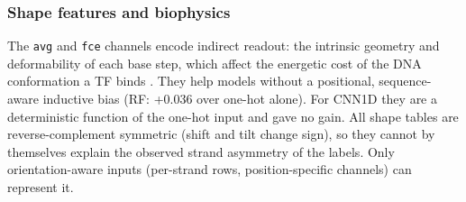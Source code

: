 \subsubsection{Shape features and biophysics}
The \texttt{avg} and \texttt{fce} channels encode indirect readout: the intrinsic geometry and deformability of each base step, which affect the energetic cost of the DNA conformation a TF binds \cite{rohs2009}. They help models without a positional, sequence-aware inductive bias (RF: +0.036 over one-hot alone). For CNN1D they are a deterministic function of the one-hot input and gave no gain. All shape tables are reverse-complement symmetric (shift and tilt change sign), so they cannot by themselves explain the observed strand asymmetry of the labels. Only orientation-aware inputs (per-strand rows, position-specific channels) can represent it.
